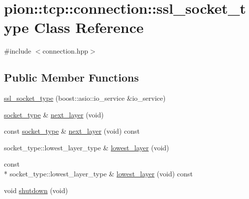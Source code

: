 \hypertarget{classpion_1_1tcp_1_1connection_1_1ssl__socket__type}{\section{pion\-:\-:tcp\-:\-:connection\-:\-:ssl\-\_\-socket\-\_\-type Class Reference}
\label{classpion_1_1tcp_1_1connection_1_1ssl__socket__type}
}


{\ttfamily \#include $<$connection.\-hpp$>$}

\subsection*{Public Member Functions}
\begin{DoxyCompactItemize}
\item 
\hyperlink{classpion_1_1tcp_1_1connection_1_1ssl__socket__type_a5b7f90631ea2613c728762a77e977924}{ssl\-\_\-socket\-\_\-type} (boost\-::asio\-::io\-\_\-service \&io\-\_\-service)
\item 
\hyperlink{classpion_1_1tcp_1_1connection_a353c4d500505d51924d165c28b04641c}{socket\-\_\-type} \& \hyperlink{classpion_1_1tcp_1_1connection_1_1ssl__socket__type_a7fcf724b89404adff092a172c9bbd2c4}{next\-\_\-layer} (void)
\item 
const \hyperlink{classpion_1_1tcp_1_1connection_a353c4d500505d51924d165c28b04641c}{socket\-\_\-type} \& \hyperlink{classpion_1_1tcp_1_1connection_1_1ssl__socket__type_adedcccb7bf8fd5703b9d14077677e6f5}{next\-\_\-layer} (void) const 
\item 
socket\-\_\-type\-::lowest\-\_\-layer\-\_\-type \& \hyperlink{classpion_1_1tcp_1_1connection_1_1ssl__socket__type_a5b16e534f3ad0a7464f24478299a06eb}{lowest\-\_\-layer} (void)
\item 
const \\*
socket\-\_\-type\-::lowest\-\_\-layer\-\_\-type \& \hyperlink{classpion_1_1tcp_1_1connection_1_1ssl__socket__type_a00497d217c63fbbca202af9dbf2281ab}{lowest\-\_\-layer} (void) const 
\item 
void \hyperlink{classpion_1_1tcp_1_1connection_1_1ssl__socket__type_a0f8e2d2d7ad991c6e3f693ce2dfe8594}{shutdown} (void)
\end{DoxyCompactItemize}


